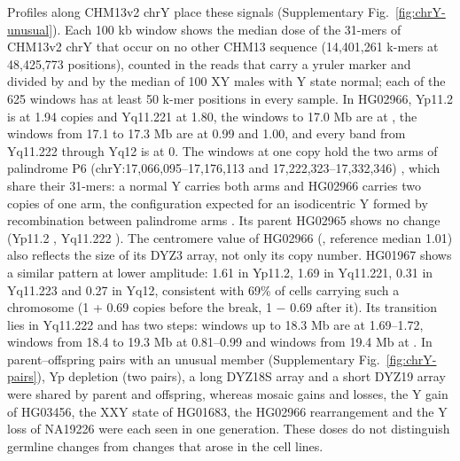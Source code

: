 Profiles along CHM13v2 chrY place these signals (Supplementary Fig.~\ref{fig:chrY-unusual}). Each 100 kb window shows the median dose of the 31-mers of CHM13v2 chrY that occur on no other CHM13 sequence (14,401,261 k-mers at 48,425,773 positions), counted in the reads that carry a yruler marker and divided by  and by the median of 100 XY males with Y state normal; each of the 625 windows has at least 50 k-mer positions in every sample. In HG02966, Yp11.2 is at 1.94 copies and Yq11.221 at 1.80, the windows  to 17.0 Mb are at , the windows from 17.1 to 17.3 Mb are at 0.99 and 1.00, and every band from Yq11.222 through Yq12 is at 0. The windows at one copy hold the two arms of palindrome P6 (chrY:17,066,095--17,176,113 and 17,222,323--17,332,346) \cite{Rhie2023}, which share their 31-mers: a normal Y carries both arms and HG02966 carries two copies of one arm, the configuration expected for an isodicentric Y formed by recombination between palindrome arms \cite{Lange2009}. Its parent HG02965 shows no change (Yp11.2 , Yq11.222 ). The centromere value of HG02966 (, reference median 1.01) also reflects the size of its DYZ3 array, not only its copy number. HG01967 shows a similar pattern at lower amplitude: 1.61 in Yp11.2, 1.69 in Yq11.221, 0.31 in Yq11.223 and 0.27 in Yq12, consistent with 69\% of cells carrying such a chromosome (1 + 0.69 copies before the break, 1 $-$ 0.69 after it). Its transition lies in Yq11.222 and has two steps: windows up to 18.3 Mb are at 1.69--1.72, windows from 18.4 to 19.3 Mb at 0.81--0.99 and windows from 19.4 Mb at .  In  parent--offspring pairs with an unusual member (Supplementary Fig.~\ref{fig:chrY-pairs}), Yp depletion (two pairs), a long DYZ18S array and a short DYZ19 array were shared by parent and offspring, whereas mosaic gains and losses, the Y gain of HG03456, the XXY state of HG01683, the HG02966 rearrangement and the Y loss of NA19226 were each seen in one generation. These doses do not distinguish germline changes from changes that arose in the cell lines.

